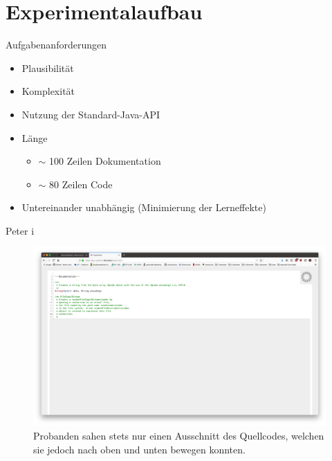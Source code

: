 \documentclass[10pt]{beamer}
\begin{document}
\section{Experimentalaufbau}

	\begin{frame}{Aufgabenanforderungen}
		\begin{itemize}
			\item Plausibilität\\
			\vspace{\baselineskip}
			\item Komplexität\\
			\vspace{\baselineskip}
            \item Nutzung der Standard-Java-API\\
            \vspace{\baselineskip}
			\item Länge
			\begin{itemize}
				\item $\sim$ 100 Zeilen Dokumentation
				\item $\sim$ 80 Zeilen Code
			\end{itemize}
			\vspace{\baselineskip}
			\item Untereinander unabhängig (Minimierung der Lerneffekte)\\
		\end{itemize}
	\end{frame}

	\begin{frame}{Peter  i}
		\begin{figure}
			\includegraphics[scale=0.15]{graphics/peter_window.png}
			\caption{\label{fig:peter_window.png} Probanden sahen stets nur einen Ausschnitt des Quellcodes, welchen sie jedoch nach oben und unten bewegen konnten.}
		\end{figure}
	\end{frame}
\end{document}
